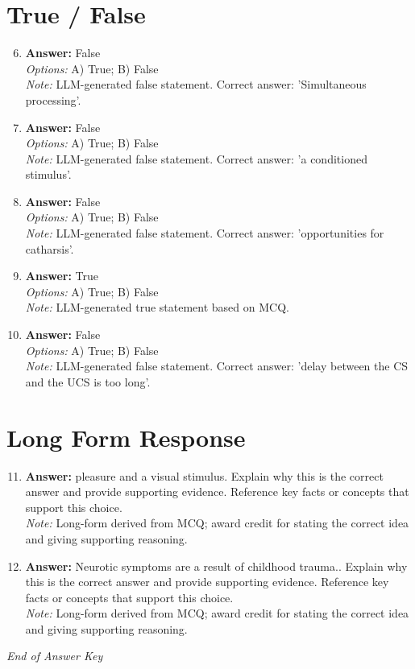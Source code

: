 \documentclass[12pt]{article}
\begin{document}
\section*{True / False}
\begin{enumerate}[label=\arabic*.]
\setcounter{enumi}{5}
\item \textbf{Answer:} False
\\ \textit{Options:} A) True; B) False
\\ \textit{Note:} LLM-generated false statement. Correct answer: 'Simultaneous processing'.
\item \textbf{Answer:} False
\\ \textit{Options:} A) True; B) False
\\ \textit{Note:} LLM-generated false statement. Correct answer: 'a conditioned stimulus'.
\item \textbf{Answer:} False
\\ \textit{Options:} A) True; B) False
\\ \textit{Note:} LLM-generated false statement. Correct answer: 'opportunities for catharsis'.
\item \textbf{Answer:} True
\\ \textit{Options:} A) True; B) False
\\ \textit{Note:} LLM-generated true statement based on MCQ.
\item \textbf{Answer:} False
\\ \textit{Options:} A) True; B) False
\\ \textit{Note:} LLM-generated false statement. Correct answer: 'delay between the CS and the UCS is too long'.
\end{enumerate}

\section*{Long Form Response}
\begin{enumerate}[label=\arabic*.]
\setcounter{enumi}{10}
\item \textbf{Answer:} pleasure and a visual stimulus. Explain why this is the correct answer and provide supporting evidence. Reference key facts or concepts that support this choice.
\\ \textit{Note:} Long-form derived from MCQ; award credit for stating the correct idea and giving supporting reasoning.
\item \textbf{Answer:} Neurotic symptoms are a result of childhood trauma.. Explain why this is the correct answer and provide supporting evidence. Reference key facts or concepts that support this choice.
\\ \textit{Note:} Long-form derived from MCQ; award credit for stating the correct idea and giving supporting reasoning.
\end{enumerate}

\vfill
\noindent\textit{End of Answer Key}
\end{document}
